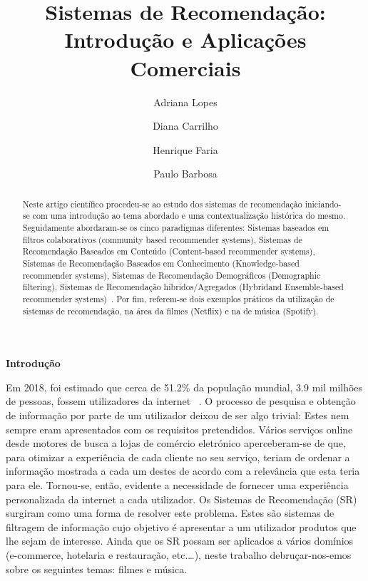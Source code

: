 %
\title{Sistemas de Recomendação: Introdução e Aplicações Comerciais}
%
%
\author{Adriana Lopes \and Diana Carrilho \and Henrique Faria \and Paulo Barbosa}
%
%
%
\maketitle              %
%
\begin{abstract}
Neste artigo científico procedeu-se ao estudo dos sistemas de recomendação iniciando-se com uma introdução ao tema abordado e uma contextualização histórica do mesmo. Seguidamente abordaram-se os cinco paradigmas diferentes: Sistemas baseados em filtros colaborativos (community based recommender systems), Sistemas de Recomendação Baseados em Conteúdo (Content-based recommender systems), Sistemas de Recomendação Baseados em Conhecimento
(Knowledge-based recommender systems), Sistemas de Recomendação Demográficos (Demographic filtering), Sistemas de Recomendação híbridos/Agregados (Hybridand Ensemble-based recommender systems)~\cite{ref_book1}. Por fim, referem-se dois exemplos práticos da utilização de sistemas de recomendação, na área da filmes (Netflix) e na de música (Spotify).\newline

\end{abstract}
%
%
\begin{center}
\normalsize{\bfseries Introdução}\hfill 
\end{center}
Em 2018, foi estimado que cerca de 51.2\% da população mundial, 3.9 mil milhões de pessoas, fossem utilizadores da internet~\cite{ref_intro1} . O processo de pesquisa e obtenção de informação por parte de um utilizador deixou de ser algo trivial: Estes nem sempre eram apresentados com os requisitos pretendidos. Vários serviços online desde motores de busca a lojas de comércio eletrónico aperceberam-se de que, para otimizar a experiência de cada cliente no seu serviço, teriam de ordenar a informação mostrada a cada um destes de acordo com a relevância que esta teria para ele. Tornou-se, então, evidente a necessidade de fornecer uma experiência personalizada da internet a cada utilizador.  
Os Sistemas de Recomendação (SR) surgiram como uma forma de resolver este problema. Estes são sistemas de filtragem de informação cujo objetivo é apresentar a um utilizador produtos que lhe sejam de interesse. 
Ainda que os SR possam ser aplicados a vários domínios (e-commerce, hotelaria e restauração, etc.…), neste trabalho debruçar-nos-emos sobre os seguintes temas: filmes e música. 





